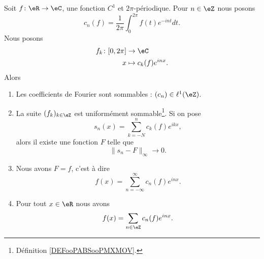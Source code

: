 \begin{theorem}     \label{ThozHXraQ}
	Soit \( f\colon \eR\to \eC\), une fonction \( C^1\) et \( 2\pi\)-périodique. Pour \( n\in \eZ\) nous posons
	\begin{equation}
		c_n(f)=\frac{1}{ 2\pi }\int_0^{2\pi}f(t) e^{-int}dt.
	\end{equation}
	Nous posons
	\begin{equation}
		\begin{aligned}
			f_k\colon \mathopen[ 0,2\pi\mathclose] & \to \eC                \\
			x                                      & \mapsto c_k(f)e^{inx}.
		\end{aligned}
	\end{equation}
	Alors
	\begin{enumerate}
		\item       \label{ITEMooIDVEooJdMEmU}
		      Les coefficients de Fourier sont sommables : \( (c_n)\in \ell^1(\eZ)\).
		\item       \label{ITEMooAUCTooTgJEPv}
		      La suite \( (f_k)_{k\in \eZ}\) est uniformément sommable\footnote{Définition \ref{DEFooPABSooPMXMOV}.}. Si on pose
		      \begin{equation}
			      s_n(x)=\sum_{k=-N}^nc_k(f) e^{ikx},
		      \end{equation}
		      alors il existe une fonction \( F\) telle que
		      \begin{equation}
			      \| s_n-F \|_{\infty}\to 0.
		      \end{equation}
		\item		\label{ITEMooSHZXooMZtdJU}
		      Nous avons \( F=f\), c'est à dire
		      \begin{equation}
			      f(x)=\sum_{n=-\infty}^{\infty}c_n(f) e^{inx}.
		      \end{equation}
		\item       \label{ITEMooGIEUooKLyXej}
		      Pour tout \( x\in \eR\) nous avons
		      \begin{equation}
			      f(x)=\sum_{n\in \eZ}c_n(f) e^{inx}.
		      \end{equation}
	\end{enumerate}
\end{theorem}

